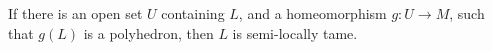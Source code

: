 If there is an open set $U$ containing $L$, and a homeomorphism $g: U \rightarrow M$, such that $g(L)$ is a polyhedron, then $L$ is semi-locally tame.
